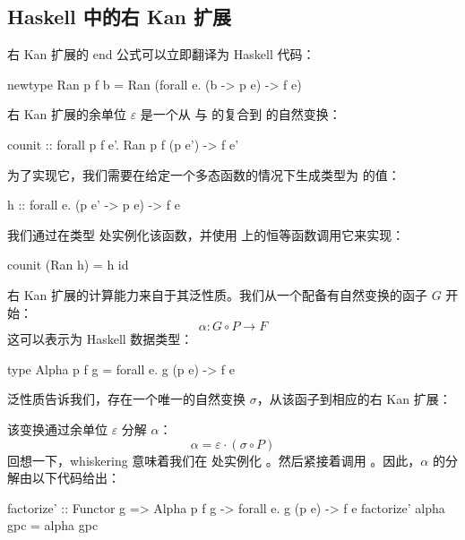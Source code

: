 \documentclass[DaoFP]{subfiles}
\begin{document}
\subsection{Haskell 中的右 Kan 扩展}
右 Kan 扩展的 end 公式可以立即翻译为 Haskell 代码：
\begin{haskell}
newtype Ran p f b = Ran (forall e. (b -> p e) -> f e)
\end{haskell}

右 Kan 扩展的余单位 $\varepsilon$ 是一个从  与  的复合到  的自然变换：
\begin{haskell}
counit :: forall p f e'. Ran p f (p e') -> f e'
\end{haskell}
为了实现它，我们需要在给定一个多态函数的情况下生成类型为  的值：
\begin{haskell}
h :: forall e. (p e' -> p e) -> f e
\end{haskell}
我们通过在类型  处实例化该函数，并使用  上的恒等函数调用它来实现：
\begin{haskell}
counit (Ran h) = h id
\end{haskell}

右 Kan 扩展的计算能力来自于其泛性质。我们从一个配备有自然变换的函子 $G$ 开始：
\[ \alpha \colon G \circ P \to F \]
这可以表示为 Haskell 数据类型：
\begin{haskell}
type Alpha p f g = forall e. g (p e) -> f e
\end{haskell}
泛性质告诉我们，存在一个唯一的自然变换 $\sigma$，从该函子到相应的右 Kan 扩展：
该变换通过余单位 $\varepsilon$ 分解 $\alpha$：
\[ \alpha = \varepsilon \cdot (\sigma \circ P) \]
回想一下，whiskering 意味着我们在  处实例化 。然后紧接着调用 。因此，$\alpha$ 的分解由以下代码给出：
\begin{haskell}
factorize' :: Functor g => Alpha p f g -> forall e. g (p e) -> f e
factorize' alpha gpc = alpha gpc
\end{haskell}
\end{document}
